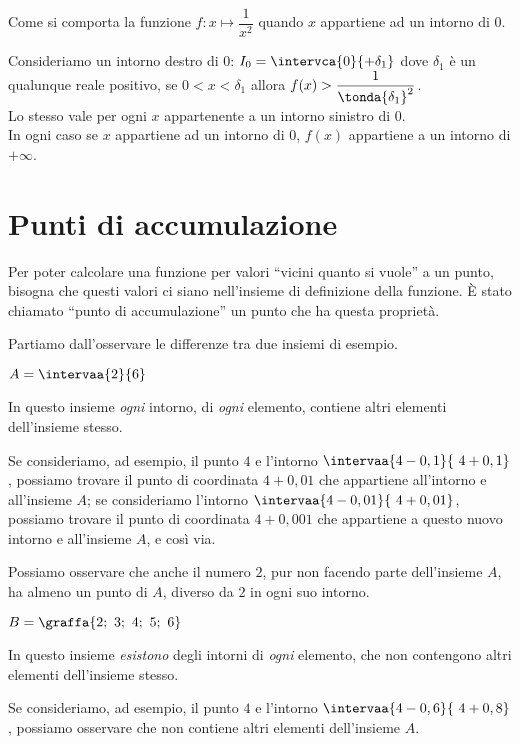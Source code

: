 \begin{esempio}
Come si comporta la funzione \quad \(f : x \mapsto \dfrac{1}{x^2}\) \quad 
quando \(x\) appartiene ad un intorno di \(0\).

Consideriamo un intorno destro di \(0\): \quad
\(I_0 = \intervca{0}{+\delta_1}\) \quad
dove \(\delta_1\) è un qualunque reale positivo,
se \(0 < x < \delta_1\) allora \(f(x) > \dfrac{1}{\tonda{\delta_1}^2}\).\\ 
Lo stesso vale per ogni \(x\) appartenente a un intorno sinistro di \(0\).\\ 
In ogni caso se \(x\) appartiene ad un intorno di \(0\), \(f(x)\) appartiene 
a 
un intorno di \(+\infty\). 
\end{esempio}


\section{Punti di accumulazione}
\label{sec:topologiapuntiaccumulazione}

Per poter calcolare una funzione per valori ``vicini quanto si vuole'' 
a un punto, bisogna che questi valori ci siano nell'insieme di definizione 
della funzione. 
È stato chiamato ``punto di accumulazione'' un punto che ha questa proprietà.

Partiamo dall'osservare le differenze tra due insiemi di esempio.

\begin{esempio}
\item \(A = \intervaa{2}{6}\) 

In questo insieme \emph{ogni} intorno, di \emph{ogni} elemento, 
contiene altri elementi dell'insieme stesso.

Se consideriamo, ad esempio, il punto \(4\) e l'intorno 
\(\intervaa{4-0,1}{~4+0,1}\), possiamo trovare il punto di coordinata 
\(4+0,01\) che appartiene all'intorno e all'insieme \(A\);
se consideriamo l'intorno 
\(\intervaa{4-0,01}{~4+0,01}\), possiamo trovare il punto di coordinata 
\(4+0,001\) che appartiene a questo nuovo intorno e all'insieme \(A\), 
e così via.

Possiamo osservare che anche il numero \(2\), pur non facendo 
parte dell'insieme \(A\), ha almeno un punto di \(A\), diverso da \(2\) in 
ogni suo intorno.
\end{esempio}

\begin{esempio}
\item \(B=\graffa{2;~3;~4;~5;~6}\) 

In questo insieme \emph{esistono} degli intorni di \emph{ogni} elemento,
che non contengono altri elementi dell'insieme stesso.

Se consideriamo, ad esempio, il punto \(4\) e l'intorno 
\(\intervaa{4-0,6}{~4+0,8}\), possiamo osservare che non contiene 
altri elementi dell'insieme \(A\).
\end{esempio}

